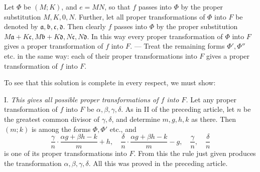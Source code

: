 Let $\Phi$ be $(M;K)$, and $e=MN$, so that $f$ passes into $\Phi$ by the proper substitution $M,K,0,N$. Further, let all proper transformations of $\Phi$ into $F$ be denoted by $\mathfrak{a},\mathfrak{b},\mathfrak{c},\mathfrak{d}$. Then clearly $f$ passes into $\Phi$ by the proper substitution $M\mathfrak{a}+K\mathfrak{c},M\mathfrak{b}+K\mathfrak{d},N\mathfrak{c},N\mathfrak{d}$. In this way every proper transformation of $\Phi$ into $F$ gives a proper transformation of $f$ into $F$. --- Treat the remaining forms $\Phi',\Phi''$ etc. in the same way: each of their proper transformations into $F$ gives a proper transformation of $f$ into $F$.

To see that this solution is complete in every respect, we must show:

I. \textit{This gives all possible proper transformations of $f$ into $F$.} Let any proper transformation of $f$ into $F$ be $\alpha,\beta,\gamma,\delta$. As in II of the preceding article, let $n$ be the greatest common divisor of $\gamma,\delta$, and determine $m,g,h,k$ as there. Then $(m;k)$ is among the forms $\Phi,\Phi'$ etc., and
\[
\frac{\gamma}{n}\cdot\frac{\alpha g+\beta h-k}{m}+h,\quad
\frac{\delta}{n}\cdot\frac{\alpha g+\beta h-k}{m}-g,\quad
\frac{\gamma}{n},\quad\frac{\delta}{n}
\]
is one of its proper transformations into $F$. From this the rule just given produces the transformation $\alpha,\beta,\gamma,\delta$. All this was proved in the preceding article.

